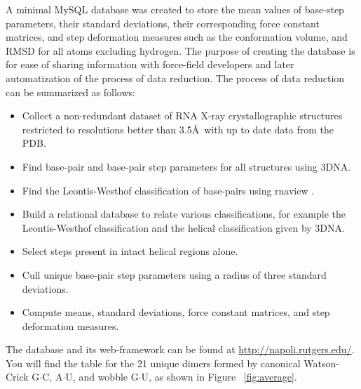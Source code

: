 A  minimal MySQL  database was  created to  store the  mean  values of
base-step parameters,  their standard deviations,  their corresponding
force  constant matrices, and  step deformation  measures such  as the
conformation volume, and RMSD for all atoms excluding hydrogen. The
purpose of creating the database is
for ease of sharing  information with force-field developers and later
automatization of the process of  data reduction.  The process of data
reduction can be summarized as follows:
\begin{itemize}
\item{Collect a non-redundant dataset of RNA X-ray crystallographic
  structures restricted to resolutions better than 3.5\AA~with up to
  date data from the PDB.}
\item{Find base-pair and base-pair step parameters for all structures
  using 3DNA.}
\item{Find the Leontis-Westhof classification of base-pairs using
  rnaview \cite{yang2003}.}
\item{Build a relational database to relate various classifications,
  for example the Leontis-Westhof classification and the helical
  classification given by 3DNA.}
\item{Select steps present in intact helical regions alone.}
\item{Cull unique base-pair step parameters using a radius of three
  standard deviations.}
\item{Compute means, standard deviations, force constant matrices, and
step deformation measures.}  
\end{itemize}  

The    database   and    its   web-framework    can   be    found   at
\url{http://napoli.rutgers.edu/}. You  will find the table  for the 21
unique dimers  formed by canonical  Watson-Crick G$\cdot$C, A$\cdot$U,
and wobble G$\cdot$U, as shown in Figure ~\ref{fig:average}.

